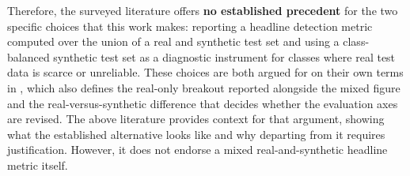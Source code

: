 Therefore, the surveyed literature offers \textbf{no established precedent} for the two specific choices that this work makes: reporting a headline detection metric computed over the union of a real and synthetic test set and using a class-balanced synthetic test set as a diagnostic instrument for classes where real test data is scarce or unreliable. These choices are both argued for on their own terms in , which also defines the real-only breakout reported alongside the mixed figure and the real-versus-synthetic difference that decides whether the evaluation axes are revised. The above literature provides context for that argument, showing what the established alternative looks like and why departing from it requires justification. However, it does not endorse a mixed real-and-synthetic headline metric itself.
